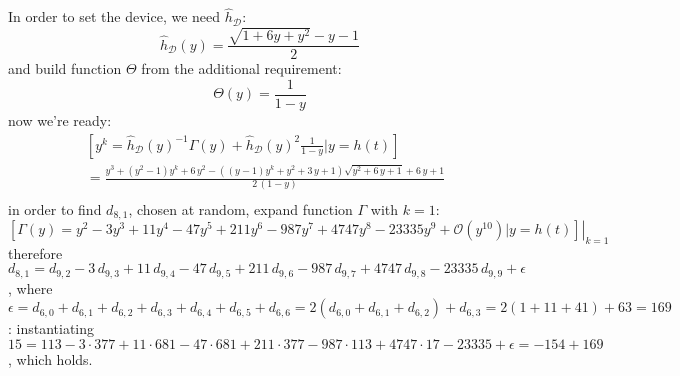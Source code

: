\documentclass[11pt,a4paper]{article} %
\begin{document}
    In order to set the device, we need $\hat{h}_{\mathcal{D}}$:
    \begin{displaymath} 
        \hat{h}_{\mathcal{D}}(y) = \frac{\sqrt{1+6y+y^2}-y-1}{2}
    \end{displaymath} 
    and build function $\Theta$ from the additional requirement:
    \begin{displaymath} 
        \Theta(y) = \frac{1}{1-y}
    \end{displaymath} 
    now we're ready:
    \begin{displaymath}
    \begin{split}
        &\left[y^{k} = \hat{h}_{\mathcal{D}}(y)^{-1} \Gamma(y) + 
            \hat{h}_{\mathcal{D}}(y)^{2}\frac{1}{1-y} \big| y = h(t) \right]\\
        &= \frac{y^{3} + {\left(y^{2} - 1\right)} y^{k} + 6 \, y^{2} - {\left({\left(y - 1\right)} y^{k} + y^{2} + 3 \, y + 1\right)} \sqrt{y^{2} + 6 \, y + 1} + 6 \, y + 1}{2 \, {\left(1-y\right)}}\\
    \end{split}
    \end{displaymath}
    in order to find $d_{8,1}$, chosen at random, expand function $\Gamma$ with $k=1$:
    \begin{displaymath}
        \left.\left[\Gamma(y)=y^2 -3y^3 + 11y^4  -47y^5 + 211y^6 -987y^7 + 4747y^8 
            -23335y^9 + \mathcal{O}(y^{10}) \big| y = h(t) \right]\right|_{k=1}
    \end{displaymath}
    therefore $d_{8,1}=d_{9,2} -3\,d_{9,3} +11\,d_{9,4}-47\,d_{9,5} 
        +211\,d_{9,6} -987\,d_{9,7} +4747\,d_{9,8}-23335\,d_{9,9}+\epsilon$,
        where $\epsilon = d_{6,0}+d_{6,1}+d_{6,2}+d_{6,3}+d_{6,4}+d_{6,5}+d_{6,6} = 
                2(d_{6,0}+d_{6,1}+d_{6,2})+d_{6,3} = 2(1 + 11 + 41) + 63 = 169$: 
        instantiating $15 = 113 -3\cdot377 +11\cdot681 -47\cdot681 +211\cdot377
            -987\cdot113 +4747\cdot17 -23335 + \epsilon = -154 + 169$, which holds.
\end{document}
